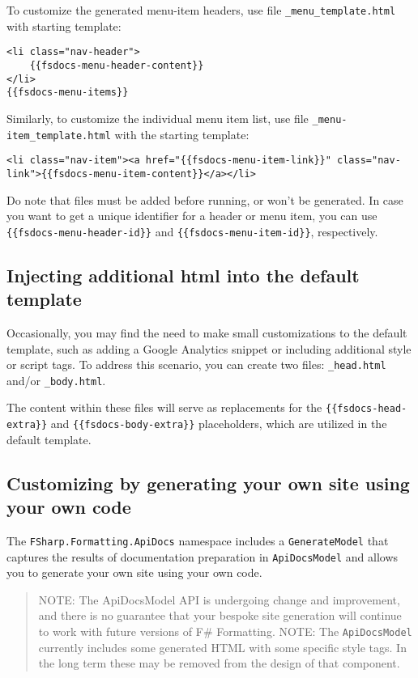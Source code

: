 \documentclass{article}
\begin{document}
To customize the generated menu-item headers, use file \texttt{\_menu\_template.html} with starting template:
\begin{lstlisting}
<li class="nav-header">
    {{fsdocs-menu-header-content}}
</li>
{{fsdocs-menu-items}}

\end{lstlisting}


Similarly, to customize the individual menu item list, use file \texttt{\_menu-item\_template.html} with the starting template:
\begin{lstlisting}
<li class="nav-item"><a href="{{fsdocs-menu-item-link}}" class="nav-link">{{fsdocs-menu-item-content}}</a></li>

\end{lstlisting}


Do note that files must be added before running, or won't be generated.
In case you want to get a unique identifier for a header or menu item, you can use \texttt{\{\{fsdocs-menu-header-id\}\}}
and \texttt{\{\{fsdocs-menu-item-id\}\}}, respectively.
\subsection*{Injecting additional html into the default template}



Occasionally, you may find the need to make small customizations to the default template, such as adding a Google
Analytics snippet or including additional style or script tags. To address this scenario, you can create two
files: \texttt{\_head.html} and/or \texttt{\_body.html}.


The content within these files will serve as replacements for the \texttt{\{\{fsdocs-head-extra\}\}} and \texttt{\{\{fsdocs-body-extra\}\}}
placeholders, which are utilized in the default template.
\subsection*{Customizing by generating your own site using your own code}



The \texttt{FSharp.Formatting.ApiDocs} namespace includes a \texttt{GenerateModel} that captures
the results of documentation preparation in \texttt{ApiDocsModel} and allows you to
generate your own site using your own code.
\begin{quote}


NOTE: The ApiDocsModel API is undergoing change and improvement, and there is no guarantee that your bespoke site
generation will continue to work
with future versions of F\# Formatting.
NOTE: The \texttt{ApiDocsModel} currently includes some generated HTML with some specific style tags.
In the long term these may be removed from the design of that component.
\end{quote}
\end{document}
